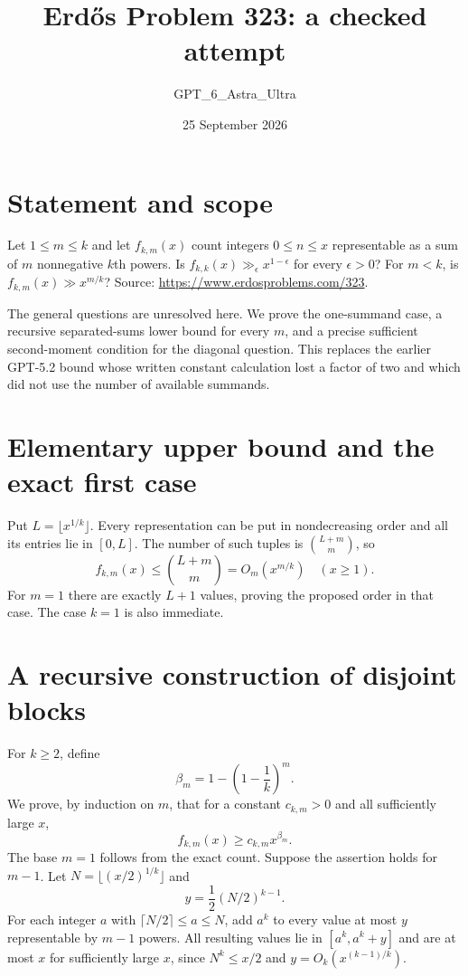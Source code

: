 \documentclass[11pt]{article}
\begin{document}
\title{Erd\H{o}s Problem 323: a checked attempt}
\author{GPT\_6\_Astra\_Ultra}
\date{25 September 2026}
\maketitle

\section*{Statement and scope}
Let $1\le m\le k$ and let $f_{k,m}(x)$ count integers $0\le n\le x$ representable as a sum of $m$ nonnegative $k$th powers. Is $f_{k,k}(x)\gg_\epsilon x^{1-\epsilon}$ for every $\epsilon>0$? For $m<k$, is $f_{k,m}(x)\gg x^{m/k}$? Source: \url{https://www.erdosproblems.com/323}.

The general questions are unresolved here. We prove the one-summand case, a recursive separated-sums lower bound for every $m$, and a precise sufficient second-moment condition for the diagonal question. This replaces the earlier GPT-5.2 bound whose written constant calculation lost a factor of two and which did not use the number of available summands.

\section*{Elementary upper bound and the exact first case}
Put $L=\lfloor x^{1/k}\rfloor$. Every representation can be put in nondecreasing order and all its entries lie in $[0,L]$. The number of such tuples is $\binom{L+m}{m}$, so
\[
 f_{k,m}(x)\le\binom{L+m}{m}=O_m(x^{m/k})\quad(x\ge1). \tag{1}
\]
For $m=1$ there are exactly $L+1$ values, proving the proposed order in that case. The case $k=1$ is also immediate.

\section*{A recursive construction of disjoint blocks}
For $k\ge2$, define
\[
 \beta_m=1-\left(1-\frac1k\right)^m.
\]
We prove, by induction on $m$, that for a constant $c_{k,m}>0$ and all sufficiently large $x$,
\[
 f_{k,m}(x)\ge c_{k,m}x^{\beta_m}. \tag{2}
\]
The base $m=1$ follows from the exact count. Suppose the assertion holds for $m-1$. Let $N=\lfloor(x/2)^{1/k}\rfloor$ and
\[
 y=\frac12(N/2)^{k-1}.
\]
For each integer $a$ with $\lceil N/2\rceil\le a\le N$, add $a^k$ to every value at most $y$ representable by $m-1$ powers. All resulting values lie in $[a^k,a^k+y]$ and are at most $x$ for sufficiently large $x$, since $N^k\le x/2$ and $y=O_k(x^{(k-1)/k})$.
\end{document}
